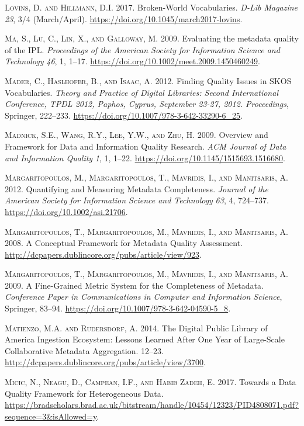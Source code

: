 \textsc{Lovins, D. and Hillmann, D.I.} 2017. Broken-World Vocabularies. \emph{D-Lib Magazine} \emph{23}, 3/4 (March/April). \url{https://doi.org/10.1045/march2017-lovins}.

\textsc{Ma, S., Lu, C., Lin, X., and Galloway, M.} 2009. Evaluating the metadata quality of the IPL. \emph{Proceedings of the American Society for Information Science and Technology} \emph{46}, 1, 1–17. \url{https://doi.org/10.1002/meet.2009.1450460249}.

\textsc{Mader, C., Haslhofer, B., and Isaac, A.} 2012. Finding Quality Issues in SKOS Vocabularies. \emph{Theory and Practice of Digital Libraries: Second International Conference, TPDL 2012, Paphos, Cyprus, September 23-27, 2012. Proceedings}, Springer, 222–233. \url{https://doi.org/10.1007/978-3-642-33290-6_25}.

\textsc{Madnick, S.E., Wang, R.Y., Lee, Y.W., and Zhu, H.} 2009. Overview and Framework for Data and Information Quality Research. \emph{ACM Journal of Data and Information Quality} \emph{1}, 1, 1–22. \url{https://doi.org/10.1145/1515693.1516680}.

\textsc{Margaritopoulos, M., Margaritopoulos, T., Mavridis, I., and Manitsaris, A.} 2012. Quantifying and Measuring Metadata Completeness. \emph{Journal of the American Society for Information Science and Technology} \emph{63}, 4, 724–737. \url{https://doi.org/10.1002/asi.21706}.

\textsc{Margaritopoulos, T., Margaritopoulos, M., Mavridis, I., and Manitsaris, A.} 2008. A Conceptual Framework for Metadata Quality Assessment. \url{http://dcpapers.dublincore.org/pubs/article/view/923}.

\textsc{Margaritopoulos, T., Margaritopoulos, M., Mavridis, I., and Manitsaris, A.} 2009. A Fine-Grained Metric System for the Completeness of Metadata. \emph{Conference Paper in Communications in Computer and Information Science}, Springer, 83–94. \url{https://doi.org/10.1007/978-3-642-04590-5_8}.

\textsc{Matienzo, M.A. and Rudersdorf, A.} 2014. The Digital Public Library of America Ingestion Ecosystem: Lessons Learned After One Year of Large-Scale Collaborative Metadata Aggregation. 12–23. \url{http://dcpapers.dublincore.org/pubs/article/view/3700}.

\textsc{Micic, N., Neagu, D., Campean, I.F., and Habib Zadeh, E.} 2017. Towards a Data Quality Framework for Heterogeneous Data. \url{https://bradscholars.brad.ac.uk/bitstream/handle/10454/12323/PID4808071.pdf?sequence=3\&isAllowed=y}.

